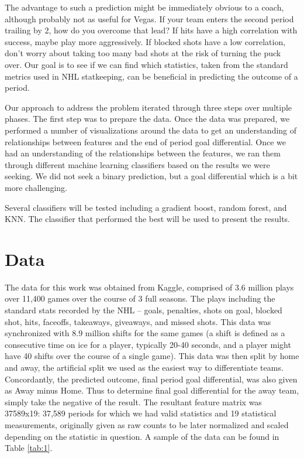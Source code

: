\documentclass[twocolumn,letterpaper,12pt,notitlepage]{article}
\begin{document}
The advantage to such a prediction might be immediately obvious to a coach, although probably
not as useful for Vegas. If your team enters the second period trailing by 2, how do you overcome that
lead? If hits have a high correlation with success, maybe play more aggressively. If blocked shots have a
low correlation, don’t worry about taking too many bad shots at the risk of turning the puck over. Our
goal is to see if we can find which statistics, taken from the standard metrics used in NHL statkeeping,
can be beneficial in predicting the outcome of a period.


Our approach to address the problem iterated through three steps over multiple phases. The first step was to prepare the data. Once the data was prepared, we performed a number of visualizations around the data to get an understanding of relationships between features and the end of period goal differential. Once we had an understanding of the relationships between the features, we ran them through different machine learning classifiers based on the results we were seeking. We did not seek a binary prediction, but a goal differential which is a bit more challenging.

Several classifiers will be tested including a gradient boost, random forest, and KNN. The classifier that performed the best will be used to present the results. 

\section{Data}

The data for this work was obtained from Kaggle, comprised of 3.6 million plays over 11,400 games over
the course of 3 full seasons. The plays including the standard stats recorded by the NHL – goals,
penalties, shots on goal, blocked shot, hits, faceoffs, takeaways, giveaways, and missed shots. This data
was synchronized with 8.9 million shifts for the same games (a shift is defined as a consecutive time on
ice for a player, typically 20-40 seconds, and a player might have 40 shifts over the course of a single
game). This data was then split by home and away, the artificial split we used as the easiest way to
differentiate teams. Concordantly, the predicted outcome, final period goal differential, was also given as
Away minus Home. Thus to determine final goal differential for the away team, simply take the negative
of the result. The resultant feature matrix was 37589x19: 37,589 periods for which we had valid
statistics and 19 statistical measurements, originally given as raw counts to be later normalized and
scaled depending on the statistic in question. A sample of the data can be found in Table \ref{tab:1}. \newline
\end{document}
